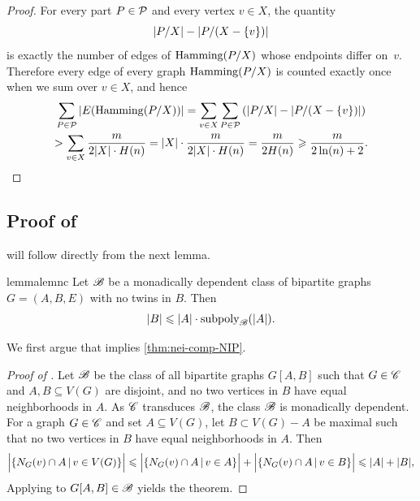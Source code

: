 \begin{proof}
  For every part $P\in\cal P$ and every vertex $v\in X$, the quantity
  \[
    |\inducedSS{P}{X}|-|\inducedSS{P}{(X-\set v)}|
  \]
  is exactly the number of edges of $\hamming(\inducedSS{P}{X})$ whose endpoints
  differ on~$v$. Therefore every edge of every graph
  $\hamming(\inducedSS{P}{X})$ is counted exactly once when we sum over
  $v\in X$, and hence
  \begin{multline*}
    \sum_{P\in\cal P}|E(\hamming(\inducedSS{P}{X}))|
    = \sum_{v\in X}
    \sum_{P\in\cal P}\left(|\inducedSS{P}{X}|-|\inducedSS{P}{(X-\set v)}|\right)\\
    > \sum_{v\in X}\frac{m}{2|X|\cdot H(n)}
    = |X|\cdot \frac{m}{2|X|\cdot H(n)}
    = \frac{m}{2H(n)}
    \ge \frac{m}{2\ln(n)+2}.
  \end{multline*}
\end{proof}


\subsection{Proof of }

  will follow directly from the next lemma.
\begin{restatable}{lemma}{lemnc}\label{lem:nc}
  Let $\BB$ be a monadically dependent class of bipartite graphs $G=(A,B,E)$
  with no twins in $B$.
  Then \begin{equation}\label{eq:bip-version}
  |B|\le |A|\cdot \subpoly_{\BB}(|A|).
\end{equation}
\end{restatable}
We first argue that  implies 
\cref{thm:nei-comp-NIP}.

\begin{proof}[Proof of ]
Let $\BB$ be the class of all bipartite graphs $G[A,B]$
such that $G\in \CC$ and $A,B\subseteq V(G)$ are disjoint,
and no two vertices in $B$ have equal neighborhoods in $A$.
As $\CC$ transduces $\BB$, the class $\BB$ is monadically dependent.
For a graph $G\in \CC$ and set $A\subseteq V(G)$, let $B\subset V(G)-A$ 
be maximal such that no two vertices in $B$ have equal neighborhoods in $A$.
Then
\[
  \Big|\setof{N_G(v)\cap A}{v\in V(G)}\Big|\le  \Big|\setof{N_G(v)\cap A}{v\in A}\Big|+\Big|\setof{N_G(v)\cap A}{v\in B}\Big|   
  \le |A|+|B|,
\]
 Applying  to $G[A,B]\in\BB$ yields the theorem.
\end{proof}

